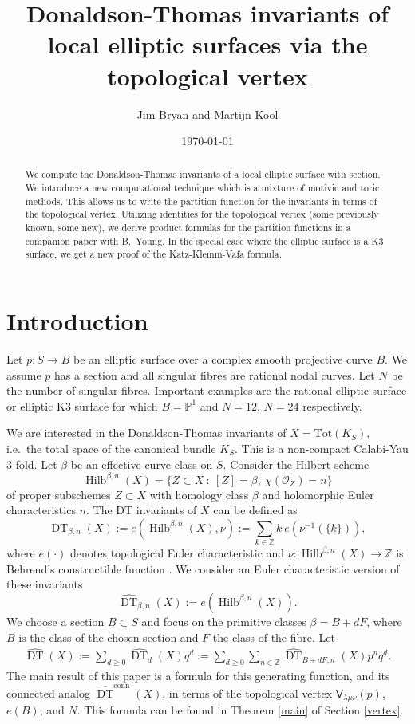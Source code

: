 \documentclass{amsart}
\title[DT invariants of local elliptic surfaces]{Donaldson-Thomas invariants of local elliptic surfaces via the topological vertex}
\author{Jim Bryan and Martijn Kool}
\date{\today}
\theoremstyle{definition}
\newcommand{\ZZ} {\mathbb{Z}}		%
\newcommand{\PP} {\mathbb{P}}
\renewcommand{\O}{\mathcal{O}}
\newcommand{\sfV}{\mathsf{V}}
\newcommand{\Hilb}{\operatorname{Hilb}}
\newcommand{\DT}{\operatorname{DT}}
\newcommand{\conn}{\operatorname{conn}}
\begin{document}
\begin{abstract}

We compute the Donaldson-Thomas invariants of a local elliptic surface
with section. We introduce a new computational technique which is a
mixture of motivic and toric methods. This allows us to write the
partition function for the invariants in terms of the topological
vertex. Utilizing identities for the topological vertex (some
previously known, some new), we derive product formulas for the
partition functions in a companion paper with B.~Young. In the special case where the elliptic surface is
a K3 surface, we get a new proof of the Katz-Klemm-Vafa formula.
\end{abstract}

\maketitle 





\section{Introduction}

Let $p : S \rightarrow B$ be an elliptic surface over a complex smooth projective curve $B$. We assume $p$ has a section and all singular fibres are rational nodal curves. Let $N$ be the number of singular fibres. Important examples are the rational elliptic surface or elliptic K3 surface for which $B = \PP^1$ and $N = 12$, $N=24$ respectively.

We are interested in the Donaldson-Thomas invariants of $X = \mathrm{Tot}(K_S)$, i.e.~the total space of the canonical bundle $K_S$. This is a non-compact Calabi-Yau 3-fold. Let $\beta$ be an effective curve class on $S$. Consider the Hilbert scheme 
$$
\Hilb^{\beta,n}(X) = \{ Z \subset X \ : \ [Z] = \beta, \ \chi(\O_Z) = n\}
$$
of proper subschemes $Z \subset X$ with homology class $\beta$ and holomorphic Euler characteristics $n$. The DT invariants of $X$ can be defined as
$$
\DT_{\beta,n}(X) := e(\Hilb^{\beta,n}(X), \nu) := \sum_{k \in \ZZ} k \ e(\nu^{-1}(\{k\})),
$$
where $e(\cdot)$ denotes topological Euler characteristic and $\nu : \Hilb^{\beta,n}(X) \rightarrow \ZZ$ is Behrend's constructible function \cite{Beh}. We consider an Euler characteristic version of these invariants
$$
\widehat{\DT}_{\beta,n}(X) := e(\Hilb^{\beta,n}(X)).
$$
We choose a section $B \subset S$ and focus on the primitive classes $\beta = B + dF$, where $B$ is the class of the chosen section and $F$ the class of the fibre. Let 
\begin{align*}
\widehat{\DT}(X) := \sum_{d \geq 0} \widehat{\DT}_d(X) q^d := \sum_{d \geq 0} \sum_{n \in \ZZ} \widehat{\DT}_{B+dF,n}(X) p^n q^d.
\end{align*}
The main result of this paper is a formula for this generating function, and its connected analog $\widehat{\DT}^{\conn}(X)$, in terms of the topological vertex $\sfV_{\lambda\mu\nu}(p)$, $e(B)$, and $N$. This formula can be found in Theorem \ref{main} of Section \ref{vertex}.
\end{document}
